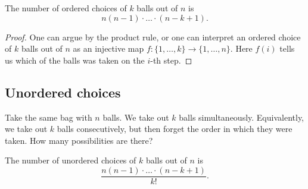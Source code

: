 \begin{page}
\setcounter{section}{2}
\setcounter{subsection}{3}
\setcounter{dfn}{10}
\label{portion:51}

\begin{thm}
The number of ordered choices of $k$ balls out of $n$ is
\[
n(n-1)\cdot \ldots \cdot (n-k+1).
\]
\end{thm}

\end{page}

\begin{page}
\setcounter{section}{2}
\setcounter{subsection}{4}
\setcounter{dfn}{10}
\label{portion:52}

\begin{proof}
One can argue by the product rule, or one can interpret an ordered choice of $k$ balls out of $n$ as an injective map $f \colon \{1, \ldots, k\} \to \{1, \ldots, n\}$.
Here $f(i)$ tells us which of the balls was taken on the $i$-th step.
\end{proof}




\end{page}

\begin{page}
\setcounter{section}{2}
\setcounter{subsection}{4}
\setcounter{dfn}{10}
\label{portion:53}

\subsection{Unordered choices}
Take the same bag with $n$ balls.
We take out $k$ balls simultaneously.
Equivalently, we take out $k$ balls consecutively, but then forget the order in which they were taken.
How many possibilities are there?


\end{page}

\begin{page}
\setcounter{section}{2}
\setcounter{subsection}{4}
\setcounter{dfn}{11}
\label{portion:55}

\begin{thm}
\label{thm:Comb}
The number of unordered choices of $k$ balls out of $n$ is
\[
\frac{n(n-1)\cdot \ldots \cdot (n-k+1)}{k!}.
\]
\end{thm}

\end{page}

